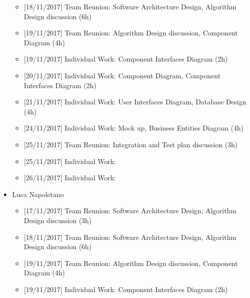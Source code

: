 \begin{itemize}
\begin{itemize}
            \item {[}18/11/2017{]} Team Reunion: Software Architecture Design, Algorithm Design discussion (6h)
            
            \item {[}19/11/2017{]} Team Reunion: Algorithm Design discussion, Component Diagram (4h)
            
            \item {[}19/11/2017{]} Individual Work: Component Interfaces Diagram (2h)
            
            \item {[}20/11/2017{]} Individual Work: Component Diagram, Component Interfaces Diagram (2h)
            
            \item {[}21/11/2017{]} Individual Work: User Interfaces Diagram, Database Design (4h)
            
            \item {[}24/11/2017{]} Individual Work: Mock up, Business Entities Diagram (4h)          


            \item {[}25/11/2017{]} Team Reunion: Integration and Test plan discussion (3h)
            
            \item {[}25/11/2017{]} Individual Work: 
            
            \item {[}26/11/2017{]} Individual Work:

        \end{itemize}
    
    \item Luca Napoletano
        \begin{itemize}
            \item {[}17/11/2017{]} Team Reunion: Software Architecture Design, Algorithm Design discussion (3h)
            
            \item {[}18/11/2017{]} Team Reunion: Software Architecture Design, Algorithm Design discussion (6h)
            
            \item {[}19/11/2017{]} Team Reunion: Algorithm Design discussion, Component Diagram (4h)
            
            \item {[}19/11/2017{]} Individual Work: Component Interfaces Diagram (2h)
            

\end{itemize}
\end{itemize}
